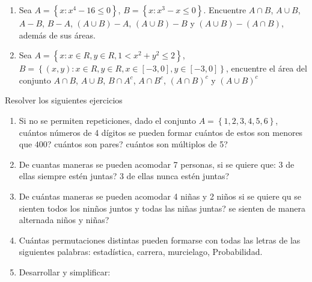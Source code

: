 \begin{Ejer}
\begin{enumerate}
\item Sea $A=\left\{x:x^4-16\leq0\right\}$, $B=\left\{x:x^3-x\leq0\right\}$. Encuentre $A\cap B$, $A\cup B$, $A-B$, $B-A$, $\left(A\cup B\right)-A$, $\left(A\cup B\right)-B$ y $\left(A\cup B\right)-\left(A\cap B\right)$, adem\'as de sus \'areas.

\item Sea $A=\left\{x:x\in R, y\in R, 1<x^{2}+y^{2}\leq2\right\}$, $B=\left\{(x,y):x\in R, y\in R, x\in\left[-3,0\right], y\in\left[-3,0\right]\right\}$, encuentre el \'area del conjunto $A\cap B$, $A\cup B$, $B\cap A^{c}$, $A\cap B^{c}$, $\left(A\cap B\right)^{c}$ y $\left(A\cup B\right)^{c}$
\end{enumerate}
\end{Ejer}

\begin{Ejer} Resolver los siguientes ejercicios

\begin{enumerate}
\item Si no se permiten repeticiones, dado el conjunto $A=\left\{1,2,3,4,5,6\right\}$, cu\'antos n\'umeros de 4 d\'igitos se pueden formar cu\'antos de estos son menores que $400$? cu\'antos son pares? cu\'antos son m\'ultiplos de 5?


\item De cuantas maneras se pueden acomodar 7 personas, si se quiere que:  3 de ellas siempre est\'en juntas?  3 de ellas nunca est\'en juntas?

\item De cu\'antas maneras se pueden acomodar 4 ni\~nas y 2 ni\~nos si se quiere qu se sienten todos los nin\~nos juntos y todas las ni\~nas juntas? se sienten de manera alternada ni\~nos y ni\~nas?


\item Cu\'antas permutaciones distintas pueden formarse con todas las letras de las siguientes palabras: estad\'istica, carrera,  murcielago, Probabilidad.


\item Desarrollar y simplificar:

\begin{itemize}
\end{itemize}


\end{enumerate}
\end{Ejer}
